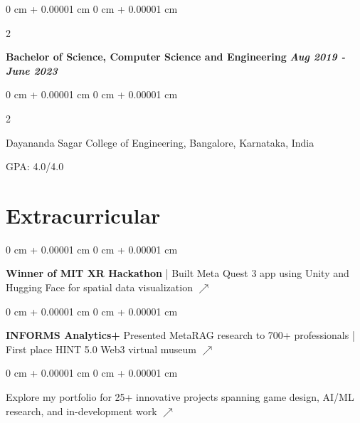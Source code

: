 \documentclass[10pt, letterpaper]{article}
\newenvironment{onecolentry}{
    \begin{adjustwidth}{
        0 cm + 0.00001 cm
    }{
        0 cm + 0.00001 cm
    }
}{
    \end{adjustwidth}
} %
\newenvironment{twocolentry}[2][]{
    \onecolentry
    \def\secondColumn{#2}
    \setcolumnwidth{\fill, 4.5 cm}
    \begin{paracol}{2}
}{
    \switchcolumn \raggedleft \secondColumn
    \end{paracol}
    \endonecolentry
} %
\begin{document}
\vspace{0.15 cm}
                    \begin{twocolentry}{
            \textit{\textbf{Aug 2019 - June 2023}}
        }
        
            \textbf{Bachelor of Science, Computer Science and Engineering}\end{twocolentry}
            \begin{twocolentry}
            {GPA: 4.0/4.0}
Dayananda Sagar College of Engineering, Bangalore, Karnataka, India
            \end{twocolentry}

  \section{Extracurricular}

\begin{onecolentry}
   \textbf{Winner of MIT XR Hackathon} | Built Meta Quest 3 app using Unity and Hugging Face for spatial data visualization \href{https://codeberg.org/reality-hack-2024/TABLE_62}{\textbf{$\nearrow$}}
\end{onecolentry}
\vspace{0.15 cm}
\begin{onecolentry}
\textbf{INFORMS Analytics+}
   Presented MetaRAG research to 700+ professionals | First place HINT 5.0 Web3 virtual museum \href{https://github.com/PranavMishra17/Nalleria}{\textbf{$\nearrow$}}
\end{onecolentry}
        \vspace{0.15 cm}
        \begin{onecolentry}
Explore my portfolio for 25+ innovative projects spanning game design, AI/ML research, and in-development work \href{https://portfolio-pranav-mishra-paranoid.vercel.app}{\textbf{$\nearrow$}}
\end{onecolentry}
\end{document}
